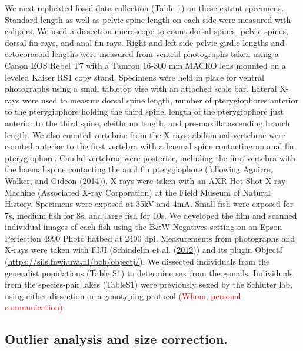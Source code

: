 \documentclass[
  12pt,
]{article}
\begin{document}
We next replicated fossil data collection (Table 1) on these extant
specimens. Standard length as well as pelvic-spine length on each side
were measured with calipers. We used a dissection microscope to count
dorsal spines, pelvic spines, dorsal-fin rays, and anal-fin rays. Right
and left-side pelvic girdle lengths and ectocoracoid lengths were
measured from ventral photographs taken using a Canon EOS Rebel T7 with
a Tamron 16-300 mm MACRO lens mounted on a leveled Kaiser RS1 copy
stand. Specimens were held in place for ventral photographs using a
small tabletop vise with an attached scale bar. Lateral X-rays were used
to measure dorsal spine length, number of pterygiophores anterior to the
pterygiophore holding the third spine, length of the pterygiophore just
anterior to the third spine, cleithrum length, and pre-maxilla ascending
branch length. We also counted vertebrae from the X-rays: abdominal
vertebrae were counted anterior to the first vertebra with a haemal
spine contacting an anal fin pterygiophore. Caudal vertebrae were
posterior, including the first vertebra with the haemal spine contacting
the anal fin pterygiophore (following Aguirre, Walker, and Gideon
(\protect\hyperlink{ref-Aguirreetal2014}{2014})). X-rays were taken with
an AXR Hot Shot X-ray Machine (Associated X-ray Corporation) at the
Field Museum of Natural History. Specimens were exposed at 35kV and 4mA.
Small fish were exposed for 7s, medium fish for 8s, and large fish for
10s. We developed the film and scanned individual images of each fish
using the B\&W Negatives setting on an Epson Perfection 4990 Photo
flatbed at 2400 dpi. Measurements from photographs and X-rays were taken
with FIJI (Schindelin et al.
(\protect\hyperlink{ref-Schindelinetal2012}{2012})) and its plugin
ObjectJ (\url{https://sils.fnwi.uva.nl/bcb/objectj/}). We dissected
individuals from the generalist populations (Table S1) to determine sex
from the gonads. Individuals from the species-pair lakes (TableS1) were
previously sexed by the Schluter lab, using either dissection or a
genotyping protocol \textcolor{red}{(Whom, personal communication)}.

\hypertarget{outlier-analysis-and-size-correction.}{%
\subsection{Outlier analysis and size
correction.}\label{outlier-analysis-and-size-correction.}}
\end{document}
